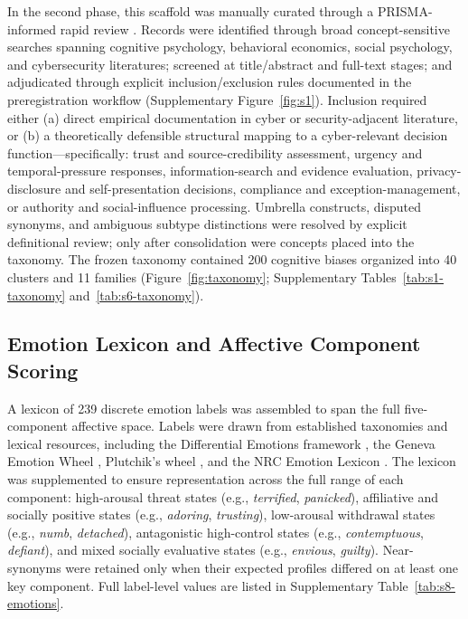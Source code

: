 \documentclass[12pt,a4paper]{article}
\begin{document}
In the second phase, this scaffold was manually curated through a PRISMA-informed rapid review \citep{page2021prisma}. Records were identified through broad concept-sensitive searches spanning cognitive psychology, behavioral economics, social psychology, and cybersecurity literatures; screened at title/abstract and full-text stages; and adjudicated through explicit inclusion/exclusion rules documented in the preregistration workflow (Supplementary Figure~\ref{fig:s1}). Inclusion required either (a) direct empirical documentation in cyber or security-adjacent literature, or (b) a theoretically defensible structural mapping to a cyber-relevant decision function---specifically: trust and source-credibility assessment, urgency and temporal-pressure responses, information-search and evidence evaluation, privacy-disclosure and self-presentation decisions, compliance and exception-management, or authority and social-influence processing. Umbrella constructs, disputed synonyms, and ambiguous subtype distinctions were resolved by explicit definitional review; only after consolidation were concepts placed into the taxonomy. The frozen taxonomy contained 200 cognitive biases organized into 40 clusters and 11 families (Figure~\ref{fig:taxonomy}; Supplementary Tables~\ref{tab:s1-taxonomy} and~\ref{tab:s6-taxonomy}).

\subsection{Emotion Lexicon and Affective Component Scoring}

A lexicon of 239 discrete emotion labels was assembled to span the full five-component affective space. Labels were drawn from established taxonomies and lexical resources, including the Differential Emotions framework \citep{izard2007basic}, the Geneva Emotion Wheel \citep{scherer2005emotions}, Plutchik's wheel \citep{plutchik1980emotion}, and the NRC Emotion Lexicon \citep{mohammad2013crowdsourcing}. The lexicon was supplemented to ensure representation across the full range of each component: high-arousal threat states (e.g., \textit{terrified}, \textit{panicked}), affiliative and socially positive states (e.g., \textit{adoring}, \textit{trusting}), low-arousal withdrawal states (e.g., \textit{numb}, \textit{detached}), antagonistic high-control states (e.g., \textit{contemptuous}, \textit{defiant}), and mixed socially evaluative states (e.g., \textit{envious}, \textit{guilty}). Near-synonyms were retained only when their expected profiles differed on at least one key component. Full label-level values are listed in Supplementary Table~\ref{tab:s8-emotions}.
\end{document}

